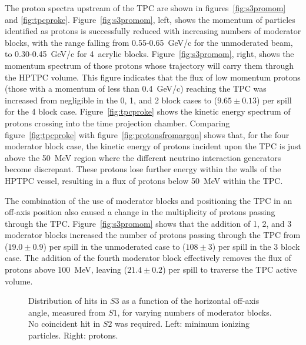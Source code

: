 The proton spectra upstream of the TPC are shown in figures~\ref{fig:s3promom} and \ref{fig:tpcproke}. 
Figure~\ref{fig:s3promom}, left, shows the momentum of particles identified as protons is successfully reduced with increasing numbers of moderator blocks, with the range falling from 0.55-0.65~GeV/c for the unmoderated beam, to 0.30-0.45~GeV/c for 4~acrylic blocks.
Figure~\ref{fig:s3promom}, right, shows the momentum spectrum of those protons whose trajectory will carry them through the HPTPC volume.
This figure indicates that the flux of low momentum protons (those with a momentum of less than 0.4~GeV/c) reaching the TPC was increased from negligible in the 0, 1, and 2 block cases to ($9.65 \pm 0.13$) per spill for the 4 block case.
Figure~\ref{fig:tpcproke} shows the kinetic energy spectrum of protons crossing into the time projection chamber.
Comparing figure~\ref{fig:tpcproke} with figure~\ref{fig:protonsfromargon} shows that, for the four moderator block case, the kinetic energy of protons incident upon the TPC is just above the 50~MeV region where the different neutrino interaction generators become discrepant.
These protons lose further energy within the walls of the HPTPC vessel, resulting in a flux of protons below 50~MeV within the TPC.

The combination of the use of moderator blocks and positioning the TPC in an off-axis position also caused a change in the multiplicity of protons passing through the TPC.
Figure~\ref{fig:s3promom} shows that the addition of 1, 2, and 3 moderator blocks increased the number of protons passing through the TPC from ($19.0 \pm 0.9$) per spill in the unmoderated case to ($108 \pm 3$) per spill in the 3 block case.
The addition of the fourth moderator block effectively removes the flux of protons above 100~MeV, leaving ($21.4 \pm 0.2$) per spill to traverse the TPC active volume.
  
\begin{figure}[h]
  \begin{minipage}{0.48\textwidth}
    \begin{adjustbox}{max totalsize={\textwidth}{.35\textheight},center}
      
    \end{adjustbox}
  \end{minipage}
  \hspace{0.3cm}
  \begin{minipage}{0.48\textwidth}
    \begin{adjustbox}{max totalsize={\textwidth}{.35\textheight},center}
      
    \end{adjustbox}
  \end{minipage}
    \caption{\label{fig:s1s3mips}Distribution of hits in $\mathit{S3}$ as a function of the horizontal off-axis angle, measured from $\mathit{S1}$, for varying numbers of moderator blocks. No coincident hit in $\mathit{S2}$ was required. Left: minimum ionizing particles. Right: protons.}
\end{figure}


